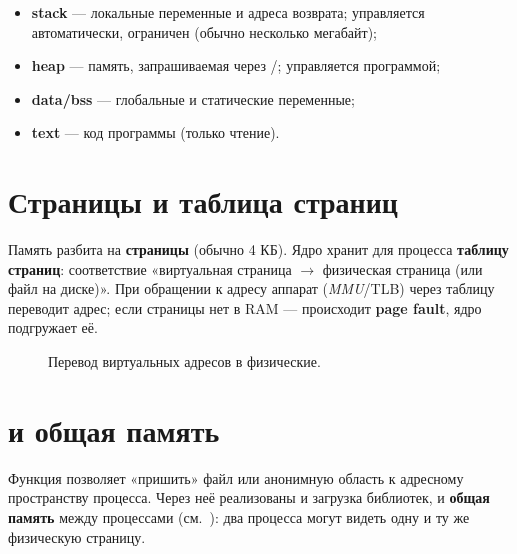 \begin{itemize}
  \item \textbf{stack} --- локальные переменные и адреса
    возврата; управляется автоматически, ограничен
    (обычно несколько мегабайт);
  \item \textbf{heap} --- память, запрашиваемая через
    /; управляется программой;
  \item \textbf{data/bss} --- глобальные и статические
    переменные;
  \item \textbf{text} --- код программы (только чтение).
\end{itemize}

\section{Страницы и таблица страниц}

Память разбита на \textbf{страницы} (обычно 4 КБ).
Ядро хранит для процесса \textbf{таблицу страниц}:
соответствие «виртуальная страница $\to$ физическая
страница (или файл на диске)». При обращении к адресу
аппарат (\emph{MMU}/TLB) через таблицу переводит адрес;
если страницы нет в RAM --- происходит \textbf{page fault},
ядро подгружает её.

\begin{figure}[htb]
  \centering
  \caption{Перевод виртуальных адресов в физические.}
  \label{fig:vm}
\end{figure}

\section{ и общая память}

Функция  позволяет «пришить» файл или
анонимную область к адресному пространству процесса.
Через неё реализованы и загрузка библиотек, и
\textbf{общая память} между процессами (см.\
): два процесса могут видеть одну
и ту же физическую страницу.

